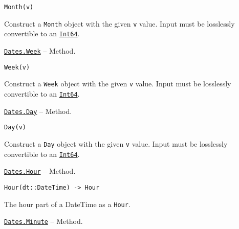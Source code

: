 \begin{adjustwidth}{2em}{0pt}


\begin{verbatim}
Month(v)
\end{verbatim}

Construct a \texttt{Month} object with the given \texttt{v} value. Input must be losslessly convertible to an \hyperlink{7720564657383125058}{\texttt{Int64}}.



\end{adjustwidth}
\hypertarget{9656974277347347506}{} 
\hyperlink{9656974277347347506}{\texttt{Dates.Week}}  -- {Method.}

\begin{adjustwidth}{2em}{0pt}


\begin{verbatim}
Week(v)
\end{verbatim}

Construct a \texttt{Week} object with the given \texttt{v} value. Input must be losslessly convertible to an \hyperlink{7720564657383125058}{\texttt{Int64}}.



\end{adjustwidth}
\hypertarget{13217464551942182596}{} 
\hyperlink{13217464551942182596}{\texttt{Dates.Day}}  -- {Method.}

\begin{adjustwidth}{2em}{0pt}


\begin{verbatim}
Day(v)
\end{verbatim}

Construct a \texttt{Day} object with the given \texttt{v} value. Input must be losslessly convertible to an \hyperlink{7720564657383125058}{\texttt{Int64}}.



\end{adjustwidth}
\hypertarget{11671105558328225558}{} 
\hyperlink{11671105558328225558}{\texttt{Dates.Hour}}  -- {Method.}

\begin{adjustwidth}{2em}{0pt}


\begin{verbatim}
Hour(dt::DateTime) -> Hour
\end{verbatim}

The hour part of a DateTime as a \texttt{Hour}.



\end{adjustwidth}
\hypertarget{15437593953944371601}{} 
\hyperlink{15437593953944371601}{\texttt{Dates.Minute}}  -- {Method.}

